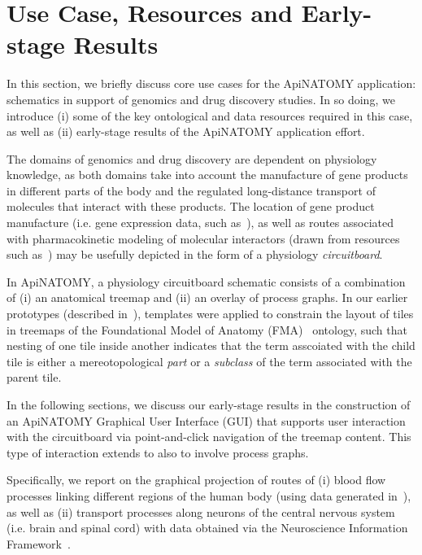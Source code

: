 \section{Use Case, Resources and Early-stage Results} \label{sect:motivation}            %

In this section, we briefly discuss core use cases for the ApiNATOMY application: schematics in support of genomics and drug discovery studies. In so doing, we introduce (i) some of the key ontological and data resources required in this case, as well as (ii) early-stage results of the ApiNATOMY application effort.

The domains of genomics and drug discovery are dependent on physiology knowledge, as both domains take into account the manufacture of gene products in different parts of the body and the regulated long-distance transport of molecules that interact with these products. The location of gene product manufacture (i.e. gene expression data, such as~\cite{EBI}), as well as routes associated with pharmacokinetic modeling of molecular interactors (drawn from resources such as~\cite{HMC+13}) may be usefully depicted in the form of a physiology \emph{circuitboard}.

In ApiNATOMY, a physiology circuitboard schematic consists of a combination of (i) an anatomical treemap and (ii) an overlay of process graphs. In our earlier prototypes (described in~\cite{BGS12,KBK14}), templates were applied to constrain the layout of tiles in treemaps of the Foundational Model of Anatomy (FMA)~\cite{RM03} ontology, such that nesting of one tile inside another indicates that the term asscoiated with the child tile is either a mereotopological \emph{part} or a \emph{subclass} of the term associated with the parent tile. 

In the following sections, we discuss our early-stage results in the construction of an ApiNATOMY Graphical User Interface (GUI) that supports user interaction with the circuitboard via point-and-click navigation of the treemap content. This type of interaction extends to also to involve process graphs.

Specifically, we report on the graphical projection of routes of (i) blood flow processes linking different regions of the human body (using data generated in~\cite{deB11}), as well as (ii) transport processes along neurons of the central nervous system (i.e. brain and spinal cord) with data obtained via the Neuroscience Information Framework~\cite{Gar+08}. 

